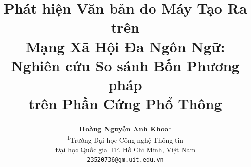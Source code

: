 \documentclass[runningheads]{llncs}
\begin{document}
\title{Phát hiện Văn bản do Máy Tạo Ra trên\\
Mạng Xã Hội Đa Ngôn Ngữ:\\
Nghiên cứu So sánh Bốn Phương pháp\\
trên Phần Cứng Phổ Thông}


\author{
    \textbf{Hoàng Nguyễn Anh Khoa}\textsuperscript{1}\\
    \textsuperscript{1}Trường Đại học Công nghệ Thông tin\\
    Đại học Quốc gia TP. Hồ Chí Minh, Việt Nam\\
    \texttt{23520736@gm.uit.edu.vn}
}



\maketitle

















\end{document}
